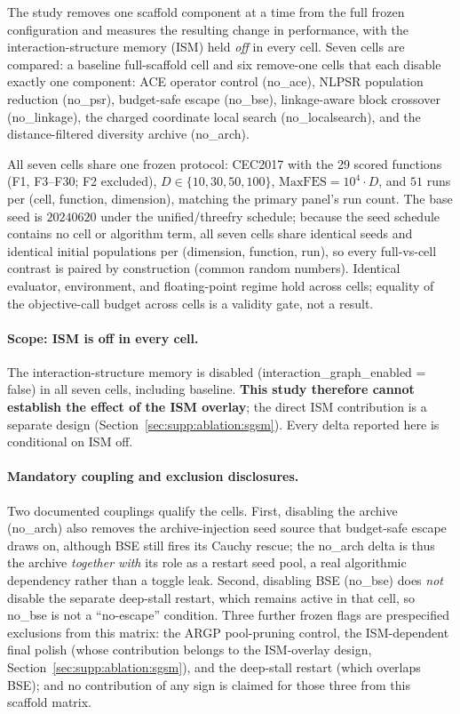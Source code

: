 \documentclass[algorithms,article,submit,moreauthors,pdftex]{Definitions/mdpi}
\begin{document}
The study removes one scaffold component at a time from the full frozen
configuration and measures the resulting change in performance, with the
interaction-structure memory (ISM) held \emph{off} in every cell.  Seven
cells are compared: a baseline full-scaffold cell and six remove-one
cells that each disable exactly one component: ACE operator control
(no\_ace), NLPSR population reduction (no\_psr),
budget-safe escape (no\_bse), linkage-aware block crossover
(no\_linkage), the charged coordinate local search
(no\_localsearch), and the distance-filtered diversity archive
(no\_arch).

All seven cells share one frozen protocol: CEC2017 with the 29 scored
functions (F1, F3--F30; F2 excluded), $D \in \{10, 30, 50, 100\}$,
$\mathrm{MaxFES} = 10^{4}\cdot D$, and $51$ runs per
(cell, function, dimension), matching the primary panel's run count.  The
base seed is $20240620$ under the unified/threefry schedule; because the seed
schedule contains no cell or algorithm term, all seven cells share identical
seeds and identical initial populations per (dimension, function, run), so
every full-vs-cell contrast is paired by construction (common random
numbers).  Identical evaluator, environment, and floating-point regime hold
across cells; equality of the objective-call budget across cells is a
validity gate, not a result.

\paragraph{Scope: ISM is off in every cell.}
The interaction-structure memory is disabled
(interaction\_graph\_enabled = false) in all seven cells, including
baseline.  \textbf{This study therefore cannot establish the effect
of the ISM overlay}; the direct ISM contribution is a separate design
(Section~\ref{sec:supp:ablation:sgsm}).  Every delta reported here is
conditional on ISM off.

\paragraph{Mandatory coupling and exclusion disclosures.}
Two documented couplings qualify the cells.  First, disabling the archive
(no\_arch) also removes the archive-injection seed source that
budget-safe escape draws on, although BSE still fires its Cauchy rescue; the
no\_arch delta is thus the archive \emph{together with} its role as a
restart seed pool, a real algorithmic dependency rather than a toggle leak.
Second, disabling BSE (no\_bse) does \emph{not} disable the separate
deep-stall restart, which remains active in that cell, so no\_bse is
not a ``no-escape'' condition.  Three further frozen flags are prespecified
exclusions from this matrix: the ARGP pool-pruning control, the
ISM-dependent final polish (whose contribution belongs to the ISM-overlay
design, Section~\ref{sec:supp:ablation:sgsm}), and the deep-stall restart
(which overlaps BSE); and no contribution of any sign is claimed for those
three from this scaffold matrix.
\end{document}
